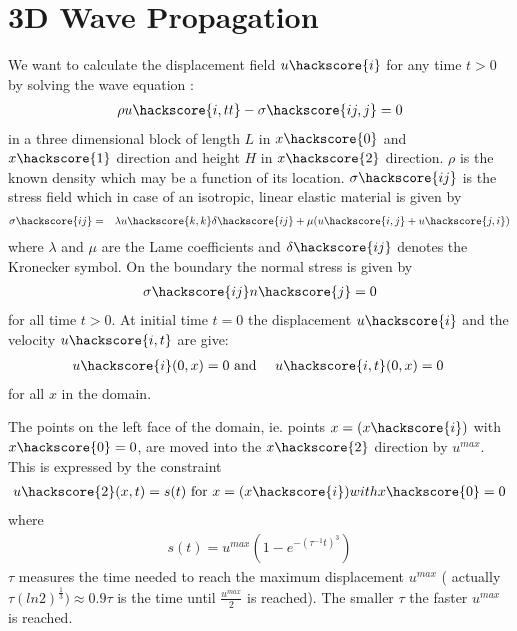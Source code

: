 \section{3D Wave Propagation}
\label{WAVE CHAP}

We want to calculate the displacement field $u\hackscore{i}$ for any time $t>0$ by solving the wave equation
:
\begin{eqnarray}\label{WAVE general problem}
\rho u\hackscore{i,tt} - \sigma\hackscore{ij,j}=0
\end{eqnarray}
in a three dimensional block of length $L$ in $x\hackscore{0}$
and $x\hackscore{1}$ direction and height $H$
in $x\hackscore{2}$ direction. $\rho$ is the known density which may be a function of its location.
$\sigma\hackscore{ij}$ is the stress field  which in case of an isotropic, linear elastic material is given by
\begin{eqnarray} \label{WAVE stress}
\sigma\hackscore{ij} & = & \lambda u\hackscore{k,k} \delta\hackscore{ij} + \mu ( u\hackscore{i,j} + u\hackscore{j,i})
\end{eqnarray}
where $\lambda$ and $\mu$ are the Lame coefficients 
 and $\delta\hackscore{ij}$ denotes the Kronecker symbol.
On the boundary the normal stress is given by
\begin{eqnarray} \label{WAVE natural}
\sigma\hackscore{ij}n\hackscore{j}=0
\end{eqnarray}
for all time $t>0$. At initial time $t=0$ the displacement 
$u\hackscore{i}$ and the velocity $u\hackscore{i,t}$ are give:
\begin{eqnarray} \label{WAVE initial}
u\hackscore{i}(0,x)=0 & \mbox{ and } & u\hackscore{i,t}(0,x)=0 \; 
\end{eqnarray}
for all $x$ in the domain. 

The points on the left face of the domain, ie. points $x=(x\hackscore{i})$ with $x\hackscore{0}=0$,
are moved into the $x\hackscore{2}$ direction by $u^{max}$. This is expressed by the constraint
\begin{eqnarray} \label{WAVE impact}
u\hackscore{2}(x,t)=s(t) \mbox{ for } x=(x\hackscore{i}) with  x\hackscore{0}=0 
\end{eqnarray}
where
\begin{eqnarray} \label{WAVE impact s}
s(t)=u^{max} (1-e^{-(\tau^{-1}t)^3})
\end{eqnarray}
$\tau$ measures the time needed to reach the maximum displacement $u^{max}$ (
actually $\tau (ln 2)^{\frac{1}{3}}) \approx 0.9 \tau$ is the time until $\frac{u^{max}}{2}$ is reached).
The smaller $\tau$ the faster $u^{max}$ is reached.

